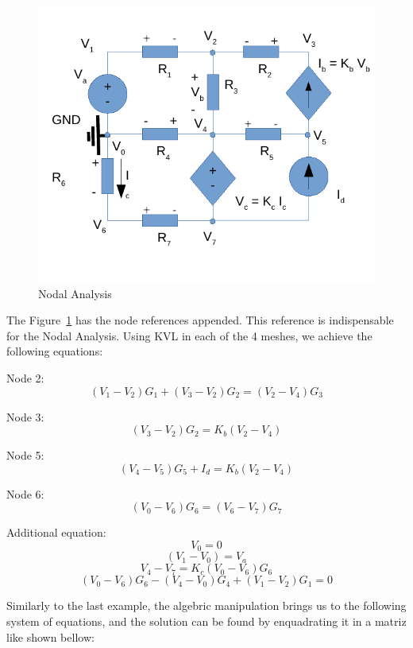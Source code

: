 \begin{figure}[h!] \centering
	\includegraphics[width=0.6\linewidth]{circ_node.pdf}
	\caption{Nodal Analysis}
	\label{fig:circuitNodes}
\end{figure}

\vspace{0.5cm}

The Figure~\ref{fig:circuitNodes} has the node references appended.
This reference is indispensable for the Nodal Analysis.
Using KVL in each of the 4 meshes, we achieve the following equations:

\vspace{0.5cm}

Node 2:
$$ (V_1 - V_2)G_1 + (V_3 - V_2)G_2 = (V_2 - V_4)G_3 $$

Node 3:
$$ (V_3 - V_2)G_2 = K_b(V_2 - V_4) $$

Node 5:
$$ (V_4 - V_5)G_5 + I_d = K_b(V_2 - V_4) $$

Node 6:
$$ (V_0 - V_6)G_6 = (V_6 - V_7)G_7 $$

Additional equation:
$$ V_0 = 0 $$
$$ (V_1 - V_0) = V_a $$
$$ V_4 - V_7 = K_c(V_0 - V_6)G_6$$
$$ (V_0 -V_6)G_6 - (V_4 - V_0)G_4 + (V_1 - V_2)G_1 = 0 $$

\vspace{0.5cm}

Similarly to the last example, the algebric manipulation brings us to the following system of equations, 
and the solution can be found by enquadrating it in a matriz like shown bellow:


